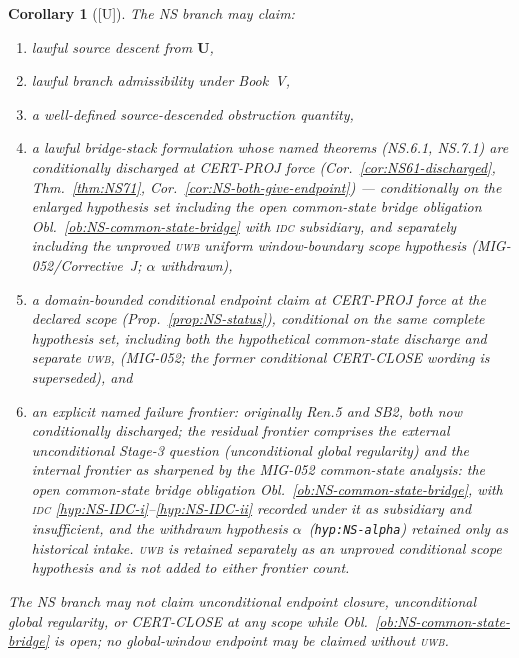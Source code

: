 \documentclass[12pt,oneside]{amsbook}
\theoremstyle{plain}
\newtheorem{corollary}[theorem]{Corollary}
\theoremstyle{definition}
\theoremstyle{remark}
\newcommand{\status}[1]{\textup{[#1]}}
\begin{document}
\begin{corollary}[\status{U}]\label{cor:NS-claims}
The NS branch may claim:
\begin{enumerate}[label=\textup{(\arabic*)}]
 \item lawful source descent from $\mathbf{U}$,
 \item lawful branch admissibility under Book~V,
 \item a well-defined source-descended obstruction quantity,
 \item a lawful bridge-stack formulation whose named theorems
 (NS.6.1, NS.7.1) are conditionally discharged at CERT-PROJ force
 (Cor.~\ref{cor:NS61-discharged}, Thm.~\ref{thm:NS71},
 Cor.~\ref{cor:NS-both-give-endpoint}) --- conditionally on the
 enlarged hypothesis set including the open common-state bridge
 obligation Obl.~\ref{ob:NS-common-state-bridge} with \textsc{idc}
 subsidiary, and separately including the unproved \textsc{uwb}
 uniform window-boundary scope hypothesis
 (MIG-052/Corrective~J; $\alpha$ withdrawn),
 \item a domain-bounded conditional endpoint claim at CERT-PROJ
 force at the declared scope (Prop.~\ref{prop:NS-status}),
 conditional on the same complete hypothesis set, including both the
 hypothetical common-state discharge and separate \textsc{uwb},
 (MIG-052; the former conditional CERT-CLOSE wording is
 superseded), and
 \item an explicit named failure frontier: originally Ren.5 and
 SB2, both now conditionally discharged; the residual frontier
 comprises the \emph{external unconditional} Stage-3 question
 (unconditional global regularity) and the \emph{internal}
 frontier as sharpened by the MIG-052 common-state analysis:
 the open common-state bridge obligation
 Obl.~\ref{ob:NS-common-state-bridge}, with \textsc{idc}
 \eqref{hyp:NS-IDC-i}--\eqref{hyp:NS-IDC-ii} recorded under it as
 subsidiary and insufficient, and the withdrawn hypothesis
 $\alpha$~(\texttt{hyp:NS-alpha}) retained only as historical
 intake.
 \textsc{uwb} is retained separately as an unproved conditional
 scope hypothesis and is not added to either frontier count.
\end{enumerate}
The NS branch may not claim unconditional endpoint closure,
unconditional global regularity, or CERT-CLOSE at any scope while
Obl.~\ref{ob:NS-common-state-bridge} is open; no global-window
endpoint may be claimed without \textsc{uwb}.
\end{corollary}
\end{document}

